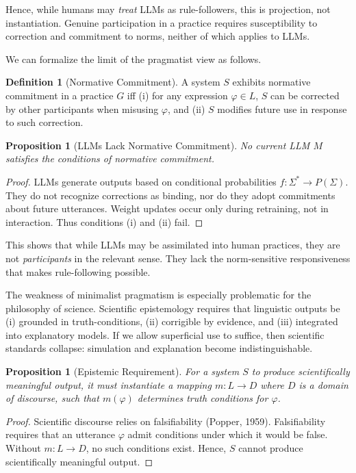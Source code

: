 \documentclass[12pt]{article}
\theoremstyle{plain}
\newtheorem{proposition}[theorem]{Proposition}
\theoremstyle{definition}
\newtheorem{definition}[theorem]{Definition}
\theoremstyle{remark}
\begin{document}
Hence, while humans may \emph{treat} LLMs as rule-followers, 
this is projection, not instantiation. 
Genuine participation in a practice requires susceptibility to correction 
and commitment to norms, neither of which applies to LLMs. 

We can formalize the limit of the pragmatist view as follows. 

\begin{definition}[Normative Commitment]
A system $S$ exhibits normative commitment in a practice $G$ 
iff (i) for any expression $\varphi \in L$, $S$ can be corrected 
by other participants when misusing $\varphi$, and 
(ii) $S$ modifies future use in response to such correction. 
\end{definition}

\begin{proposition}[LLMs Lack Normative Commitment]
No current LLM $M$ satisfies the conditions of normative commitment. 
\end{proposition}

\begin{proof}
LLMs generate outputs based on conditional probabilities 
$f: \Sigma^* \to P(\Sigma)$. They do not recognize corrections as binding, 
nor do they adopt commitments about future utterances. 
Weight updates occur only during retraining, not in interaction. 
Thus conditions (i) and (ii) fail. \qedhere
\end{proof}

This shows that while LLMs may be assimilated into 
human practices, they are not \emph{participants} in the relevant sense. 
They lack the norm-sensitive responsiveness that makes rule-following 
possible. 

The weakness of minimalist pragmatism is especially problematic for the 
philosophy of science. Scientific epistemology requires that linguistic 
outputs be (i) grounded in truth-conditions, (ii) corrigible by evidence, 
and (iii) integrated into explanatory models. 
If we allow superficial use to suffice, then scientific standards collapse: 
simulation and explanation become indistinguishable. 

\begin{proposition}[Epistemic Requirement]
For a system $S$ to produce scientifically meaningful output, 
it must instantiate a mapping $m: L \to D$ where $D$ is a 
domain of discourse, such that $m(\varphi)$ determines truth conditions 
for $\varphi$. 
\end{proposition}

\begin{proof}
Scientific discourse relies on falsifiability (Popper, 1959). 
Falsifiability requires that an utterance $\varphi$ admit conditions under 
which it would be false. Without $m: L \to D$, no such conditions exist. 
Hence, $S$ cannot produce scientifically meaningful output. \qedhere
\end{proof}
\end{document}
